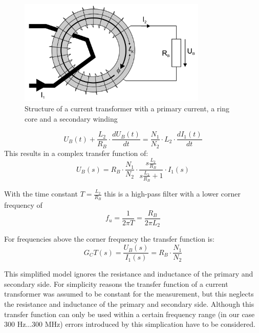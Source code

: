 \begin{figure}
	\includegraphics[width=0.8\textwidth]{figures/Theory/ct_setup}
	\caption[Kurze Abbildungsbeschreibung]{Structure of a current transformer with a primary current, a ring core and a secondary winding \protect\footnotemark}
	\label{fig.ct_setup}
\end{figure}

\begin{equation}
U_B(t) + \frac{L_2}{R_B} \cdot \frac{dU_B(t)}{dt}=\frac{N_1}{N_2} \cdot L_2 \cdot \frac{dI_1(t)}{dt}
\end{equation}
This results in a complex transfer function of: 
\begin{equation}
U_B(s) = R_B \cdot \frac{N_1}{N_2} \cdot \frac{s \frac{L_2}{R_B}}{s \frac{L_2}{R_B} +1} \cdot I_1(s)
\end{equation}

With the time constant $T=\frac{L_2}{R_B}$ this is a high-pass filter with a lower corner frequency of 
\begin{equation}
f_u= \frac{1}{2 \pi T} = \frac{R_B}{2 \pi L_2}
\end{equation}

For frequencies above the corner frequency the transfer function is:
\begin{equation}
G_CT(s) = \frac{U_B(s)}{I_1(s)}=R_B \cdot \frac{N_1}{N_2}
\end{equation}

This simplified model ignores the resistance and inductance of the primary and secondary side. 
For simplicity reasons the transfer function of a current transformer was assumed to be constant for the measurement, but this neglects the resistance and inductance of the primary and secondary side. Although this transfer function can only be used within a certain frequency range (in our case 300 Hz...300 MHz) errors introduced by this simplication have to be considered. 


